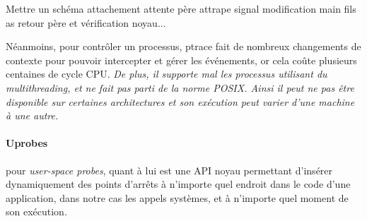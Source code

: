 {\color{red} Mettre un schéma attachement attente père attrape signal
  modification main fils as retour père et vérification noyau...}

Néanmoins, pour contrôler un processus, ptrace fait de nombreux changements de
contexte pour pouvoir intercepter et gérer les événements, or cela coûte
plusieurs centaines de cycle CPU. \textit{De plus, il supporte mal les processus
utilisant du multithreading, et ne fait pas parti de la norme POSIX. Ainsi il
peut ne pas être disponible sur certaines architectures et son exécution peut
varier d'une machine à une autre.}

\paragraph{Uprobes}\citet{AS:Interception, MARION:Interception}



pour \textit{user-space probes}, quant à lui est une API noyau permettant
d'insérer dynamiquement des points d'arrêts à n'importe quel endroit dans le
code d'une application, dans notre cas les appels systèmes, et à n'importe quel
moment de son exécution.

